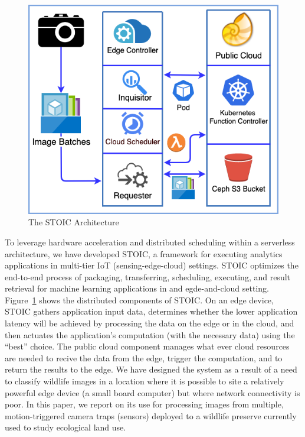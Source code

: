 \begin{figure}
    \centering
    \includegraphics[scale=0.4]{figures/STOIC.png}
    \caption{The STOIC Architecture \label{fig:STOIC}}
\end{figure}

To leverage hardware acceleration and distributed scheduling within a
serverless architecture, we have developed STOIC, a framework for executing
analytics applications in multi-tier IoT (sensing-edge-cloud) settings. STOIC
optimizes the end-to-end process of packaging, transferring, scheduling,
executing, and result retrieval for machine learning applications in and
egde-and-cloud setting.  Figure~\ref{fig:STOIC} shows the distributed
components of STOIC. On an edge device, STOIC gathers application input data,
determines whether the lower application latency will be achieved by
processing the data on the edge or in the cloud, and then actuates the
application's computation (with the necessary data) using the ``best'' choice.
The public cloud component manages what ever cloud resources are needed to
recive the data from the edge, trigger the computation, and to return the
results to the edge.  We have designed the system as a result of a need to
classify wildlife images in a location where it is possible to site a
relatively powerful edge device (a small board computer) but where network
connectivity is poor.  In this paper, we report on its use for processing
images from multiple, motion-triggered camera traps (sensors) deployed to
a wildlife preserve currently used to study ecological land use.

